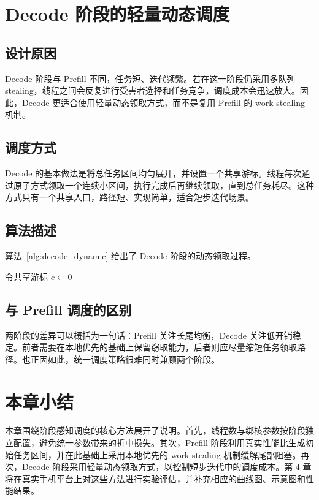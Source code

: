 \section{Decode 阶段的轻量动态调度}

\subsection{设计原因}

Decode 阶段与 Prefill 不同，任务短、迭代频繁。若在这一阶段仍采用多队列 stealing，线程之间会反复进行受害者选择和任务竞争，调度成本会迅速放大。因此，Decode 更适合使用轻量动态领取方式，而不是复用 Prefill 的 work stealing 机制。

\subsection{调度方式}

Decode 的基本做法是将总任务区间均匀展开，并设置一个共享游标。线程每次通过原子方式领取一个连续小区间，执行完成后再继续领取，直到总任务耗尽。这种方式只有一个共享入口，路径短、实现简单，适合短步迭代场景。

\subsection{算法描述}

算法~\ref{alg:decode_dynamic} 给出了 Decode 阶段的动态领取过程。

\begin{algorithm}[ht]
\caption{Decode 阶段的动态任务领取}
\label{alg:decode_dynamic}
令共享游标 $c \leftarrow 0$\;
\ForPar{每个线程}{
  \While{true}{
    原子领取区间起点 $l \leftarrow c$，并令 $c \leftarrow c + s$\;
    \If{$l \geq N$}{
      退出循环\;
    }
    令 $r \leftarrow \min(N, l + s)$\;
    执行区间 $[l, r)$ 内的任务\;
  }
}
\end{algorithm}

\subsection{与 Prefill 调度的区别}

两阶段的差异可以概括为一句话：Prefill 关注长尾均衡，Decode 关注低开销稳定。前者需要在本地优先的基础上保留窃取能力，后者则应尽量缩短任务领取路径。也正因如此，统一调度策略很难同时兼顾两个阶段。

\section{本章小结}

本章围绕阶段感知调度的核心方法展开了说明。首先，线程数与绑核参数按阶段独立配置，避免统一参数带来的折中损失。其次，Prefill 阶段利用真实性能比生成初始任务区间，并在此基础上采用本地优先的 work stealing 机制缓解尾部阻塞。再次，Decode 阶段采用轻量动态领取方式，以控制短步迭代中的调度成本。第 4 章将在真实手机平台上对这些方法进行实验评估，并补充相应的曲线图、示意图和性能结果。
